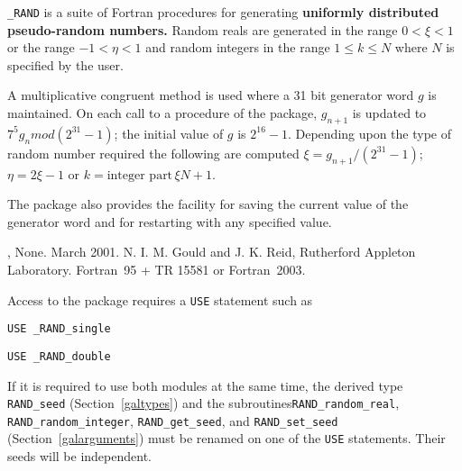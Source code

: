 \documentclass{galahad}
\newcommand{\packagename}{RAND}
\newcommand{\fullpackagename}{\libraryname\_\packagename}
\begin{document}
\galheader


\galsummary

{\tt \fullpackagename} is a suite of Fortran procedures for
generating {\bf uniformly distributed pseudo-random
 numbers. } Random reals are generated in the range $0 < \xi < 1$ or
 the range $-1 < \eta < 1$ and random integers in the range
 $1 \leq k \leq N$ where $N$ is specified by the user.

A multiplicative congruent method is used where a 31 bit generator
 word $g$ is maintained. On each call to a procedure of the package,
 $g_{n+1} $ is updated to $7^5 g_n mod (2^{31} - 1)$; the
 initial value of $g$ is $2^{16} - 1$.
 Depending upon the type of random number
 required the following are computed $\xi = g_{n+1} /(2^{31} - 1)$;
 $\eta = 2 \xi - 1$ or $k = \mbox{integer part}\, \xi N +1$.

The package also provides the facility for saving the current
 value of the generator word and for restarting with any specified
 value.



\galattributes
\galversions{\tt  \fullpackagename\_single, \fullpackagename\_double},
\galuses None.
\galdate March 2001.
\galorigin
N. I. M. Gould and J. K. Reid, Rutherford Appleton Laboratory.
\gallanguage Fortran~95 + TR 15581 or Fortran~2003.


\galhowto

Access to the package requires a {\tt USE} statement such as

\medskip{}

\hskip0.5in {\tt USE \fullpackagename\_single}

\medskip{}

\hskip0.5in {\tt USE  \fullpackagename\_double}

\medskip
If it is required to use both modules at the same time, the derived type
{\tt \packagename\_seed}
(Section~\ref{galtypes})
and the subroutines{\tt \packagename\_random\_real},
{\tt \packagename\_random\_integer},
{\tt \packagename\_get\_seed},
and {\tt \packagename\_set\_seed}
(Section~\ref{galarguments})
must be renamed on one of the {\tt USE} statements.
Their seeds will be independent.
\end{document}
